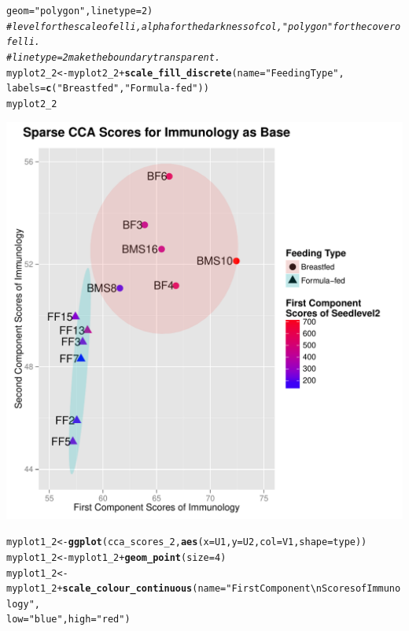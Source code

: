 \documentclass[12pt]{article}\usepackage[]{graphicx}\usepackage[]{color}
\makeatletter
\def\maxwidth{ %
  \ifdim\Gin@nat@width>\linewidth
    \linewidth
  \else
    \Gin@nat@width
  \fi
}
\newcommand{\hlnum}[1]{\textcolor[rgb]{0.686,0.059,0.569}{#1}}%
\newcommand{\hlstr}[1]{\textcolor[rgb]{0.192,0.494,0.8}{#1}}%
\newcommand{\hlcom}[1]{\textcolor[rgb]{0.678,0.584,0.686}{\textit{#1}}}%
\newcommand{\hlopt}[1]{\textcolor[rgb]{0,0,0}{#1}}%
\newcommand{\hlstd}[1]{\textcolor[rgb]{0.345,0.345,0.345}{#1}}%
\newcommand{\hlkwb}[1]{\textcolor[rgb]{0.69,0.353,0.396}{#1}}%
\newcommand{\hlkwc}[1]{\textcolor[rgb]{0.333,0.667,0.333}{#1}}%
\newcommand{\hlkwd}[1]{\textcolor[rgb]{0.737,0.353,0.396}{\textbf{#1}}}%
\newenvironment{kframe}{%
 \def\at@end@of@kframe{}%
 \ifinner\ifhmode%
  \def\at@end@of@kframe{\end{minipage}}%
  \begin{minipage}{\columnwidth}%
 \fi\fi%
 \def\FrameCommand##1{\hskip\@totalleftmargin \hskip-\fboxsep
 \colorbox{shadecolor}{##1}\hskip-\fboxsep
     \hskip-\linewidth \hskip-\@totalleftmargin \hskip\columnwidth}%
 \MakeFramed {\advance\hsize-\width
   \@totalleftmargin\z@ \linewidth\hsize
   \@setminipage}}%
 {\par\unskip\endMakeFramed%
 \at@end@of@kframe}
\newenvironment{knitrout}{}{} %
\makeatother
\begin{document}
\begin{knitrout}
\begin{kframe}
\begin{alltt}
                                  \hlkwc{geom}\hlstd{=}\hlstr{"polygon"}\hlstd{,}\hlkwc{linetype}\hlstd{=}\hlnum{2}\hlstd{)}
\hlcom{#level for the scale of elli, alpha for the darkness of col,"polygon" for the cover of elli.}
\hlcom{#linetype=2 make the boundary transparent.}
\hlstd{myplot2_2}\hlkwb{<-}\hlstd{myplot2_2}\hlopt{+}\hlkwd{scale_fill_discrete}\hlstd{(}\hlkwc{name}\hlstd{=}\hlstr{"Feeding Type"}\hlstd{,}
                                      \hlkwc{labels}\hlstd{=}\hlkwd{c}\hlstd{(}\hlstr{"Breastfed"}\hlstd{,}\hlstr{"Formula-fed"}\hlstd{))}
\hlstd{myplot2_2}
\end{alltt}
\end{kframe}
\includegraphics[width=\maxwidth]{figure/plot2-1} 
\begin{kframe}\begin{alltt}
\hlstd{myplot1_2}\hlkwb{<-}\hlkwd{ggplot}\hlstd{(cca_scores_2,}\hlkwd{aes}\hlstd{(}\hlkwc{x}\hlstd{=U1,}\hlkwc{y}\hlstd{=U2,}\hlkwc{col}\hlstd{=V1,}\hlkwc{shape}\hlstd{=type))}
\hlstd{myplot1_2}\hlkwb{<-}\hlstd{myplot1_2}\hlopt{+}\hlkwd{geom_point}\hlstd{(}\hlkwc{size}\hlstd{=}\hlnum{4}\hlstd{)}
\hlstd{myplot1_2}\hlkwb{<-}\hlstd{myplot1_2}\hlopt{+}\hlkwd{scale_colour_continuous}\hlstd{(}\hlkwc{name}\hlstd{=}\hlstr{"First Component\textbackslash{}nScores of Immunology"}\hlstd{,}
                                         \hlkwc{low}\hlstd{=}\hlstr{"blue"}\hlstd{,}\hlkwc{high}\hlstd{=}\hlstr{"red"}\hlstd{)}

\end{alltt}
\end{kframe}
\end{knitrout}
\end{document}
